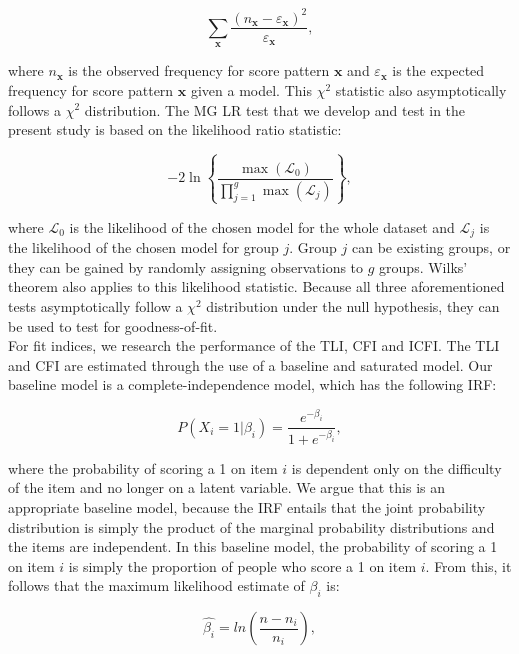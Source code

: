 \documentclass[Royal,sageapa,times,doublespace]{sagej}
\begin{document}
\begin{equation}
\sum_{\boldsymbol{x}} \frac{(n_{\boldsymbol{x}} - \varepsilon_{\boldsymbol{x}})^2}{\varepsilon_{\boldsymbol{x}}},
\end{equation}

where $n_{\boldsymbol{x}}$ is the observed frequency for score pattern $\boldsymbol{x}$ and $\varepsilon_{\boldsymbol{x}}$ is the expected frequency for score pattern $\boldsymbol{x}$ given a model. This $\chi^2$ statistic also asymptotically follows a $\chi^2$ distribution. The MG LR test that we develop and test in the present study is based on the likelihood ratio statistic: 

\begin{equation}
-2 \ln \left \{ \frac{\max(\mathcal{L}_0)}{\prod_{j = 1}^g \max(\mathcal{L}_j)} \right \},
\end{equation}
 
where $\mathcal{L}_0$ is the likelihood of the chosen model for the whole dataset and $\mathcal{L}_j$ is the likelihood of the chosen model for group $j$. Group $j$ can be existing groups, or they can be gained by randomly assigning observations to $g$ groups. Wilks' theorem also applies to this likelihood statistic. Because all three aforementioned tests asymptotically follow a $\chi^2$ distribution under the null hypothesis, they can be used to test for goodness-of-fit. \\
\indent For fit indices, we research the performance of the TLI, CFI and ICFI. The TLI and CFI are estimated through the use of a baseline and saturated model. Our baseline model is a complete-independence model, which has the following IRF:

\begin{equation}
P(X_i = 1 | \beta_{i}) = \frac{e^{- \beta_{i}}}{1 + e^{- \beta_{i}}},
\end{equation}

where the probability of scoring a 1 on item $i$ is dependent only on the difficulty of the item and no longer on a latent variable. We argue that this is an appropriate baseline model, because the IRF entails that the joint probability distribution is simply the product of the marginal probability distributions and the items are independent. In this baseline model, the probability of scoring a 1 on item $i$ is simply the proportion of people who score a 1 on item $i$. From this, it follows that the maximum likelihood estimate of $\beta_{i}$ is:

\begin{equation*}
\hat{\beta_{i}} = ln(\frac{n - n_i}{n_i}), 
\end{equation*}
\end{document}

